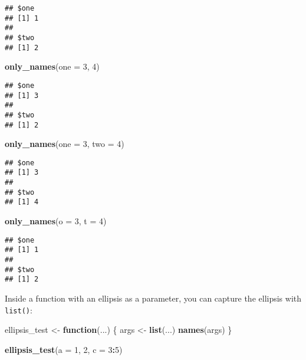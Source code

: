 \documentclass[]{book}
\newenvironment{Shaded}{\begin{snugshade}}{\end{snugshade}}
\newcommand{\ControlFlowTok}[1]{\textcolor[rgb]{0.13,0.29,0.53}{\textbf{#1}}}
\newcommand{\DataTypeTok}[1]{\textcolor[rgb]{0.13,0.29,0.53}{#1}}
\newcommand{\DecValTok}[1]{\textcolor[rgb]{0.00,0.00,0.81}{#1}}
\newcommand{\KeywordTok}[1]{\textcolor[rgb]{0.13,0.29,0.53}{\textbf{#1}}}
\newcommand{\NormalTok}[1]{#1}
\newcommand{\OperatorTok}[1]{\textcolor[rgb]{0.81,0.36,0.00}{\textbf{#1}}}
\newcommand{\StringTok}[1]{\textcolor[rgb]{0.31,0.60,0.02}{#1}}
\begin{document}
\begin{verbatim}
## $one
## [1] 1
## 
## $two
## [1] 2
\end{verbatim}

\begin{Shaded}
\begin{Highlighting}[]
\KeywordTok{only_names}\NormalTok{(}\DataTypeTok{one =} \DecValTok{3}\NormalTok{, }\DecValTok{4}\NormalTok{)}
\end{Highlighting}
\end{Shaded}

\begin{verbatim}
## $one
## [1] 3
## 
## $two
## [1] 2
\end{verbatim}

\begin{Shaded}
\begin{Highlighting}[]
\KeywordTok{only_names}\NormalTok{(}\DataTypeTok{one =} \DecValTok{3}\NormalTok{, }\DataTypeTok{two =} \DecValTok{4}\NormalTok{)}
\end{Highlighting}
\end{Shaded}

\begin{verbatim}
## $one
## [1] 3
## 
## $two
## [1] 4
\end{verbatim}

\begin{Shaded}
\begin{Highlighting}[]
\KeywordTok{only_names}\NormalTok{(}\DataTypeTok{o =} \DecValTok{3}\NormalTok{, }\DataTypeTok{t =} \DecValTok{4}\NormalTok{)}
\end{Highlighting}
\end{Shaded}

\begin{verbatim}
## $one
## [1] 1
## 
## $two
## [1] 2
\end{verbatim}

Inside a function with an ellipsis as a parameter, you can capture the ellipsis with \texttt{list()}:

\begin{Shaded}
\begin{Highlighting}[]
\NormalTok{ellipsis_test <-}\StringTok{ }\ControlFlowTok{function}\NormalTok{(...) \{}
\NormalTok{  args <-}\StringTok{ }\KeywordTok{list}\NormalTok{(...)}
  \KeywordTok{names}\NormalTok{(args)}
\NormalTok{\}}

\KeywordTok{ellipsis_test}\NormalTok{(}\DataTypeTok{a =} \DecValTok{1}\NormalTok{, }\DecValTok{2}\NormalTok{, }\DataTypeTok{c =} \DecValTok{3}\OperatorTok{:}\DecValTok{5}\NormalTok{)}
\end{Highlighting}
\end{Shaded}
\end{document}
